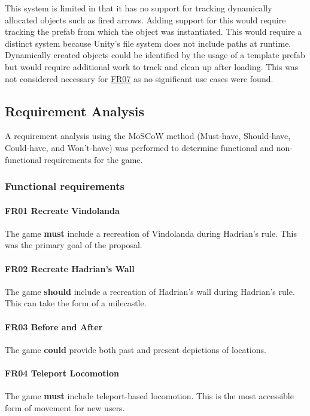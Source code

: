 \documentclass[sigconf]{acmart}
\begin{document}
This system is limited in that it has no support for tracking dynamically allocated
objects such as fired arrows. Adding support for this would require tracking the
prefab from which the object was instantiated. This would require a distinct system
because Unity's file system does not include paths at runtime. Dynamically created
objects could be identified by the usage of a template prefab but would require
additional work to track and clean up after loading. This was not considered
necessary for \hyperref[sec:fr_save]{FR07} as no significant use cases were found.

\subsection{Requirement Analysis}

A requirement analysis using the MoSCoW method (Must-have, Should-have,
Could-have, and Won't-have) was performed to determine functional and
non-functional requirements for the game.

\subsubsection{Functional requirements}

\paragraph{\label{sec:fr_recreate}FR01 Recreate Vindolanda}
The game \textbf{must} include a recreation of Vindolanda during Hadrian's
rule. This was the primary goal of the proposal.

\paragraph{\label{sec:fr_wall}FR02 Recreate Hadrian's Wall}
The game \textbf{should} include a recreation of Hadrian's wall during Hadrian's
rule. This can take the form of a milecastle.

\paragraph{\label{sec:fr_beforeafter}FR03 Before and After}
The game \textbf{could} provide both past and present depictions of locations.

\paragraph{\label{sec:fr_teleport}FR04 Teleport Locomotion}
The game \textbf{must} include teleport-based locomotion. This is the most
accessible form of movement for new users.
\end{document}
